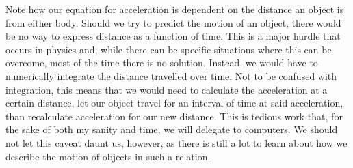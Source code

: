 Note how our equation for acceleration is dependent on the distance an object is from either body.
Should we try to predict the motion of an object, there would be no way to express distance as a function of time.
This is a major hurdle that occurs in physics and, while there can be specific situations where this can be overcome, most of the time there is no solution.
Instead, we would have to numerically integrate the distance travelled over time.
Not to be confused with integration, this means that we would need to calculate the acceleration at a certain distance, let our object travel for an interval of time at said acceleration, than recalculate acceleration for our new distance.
This is tedious work that, for the sake of both my sanity and time, we will delegate to computers.
We should not let this caveat daunt us, however, as there is still a lot to learn about how we describe the motion of objects in such a relation.

